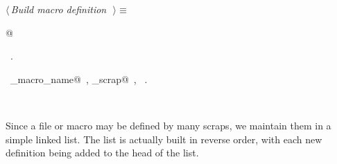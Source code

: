 \documentclass{report}
\begin{document}
\begin{flushleft} \small
\begin{minipage}{\linewidth} \label{scrap39}
$\langle\,${\it Build macro definition}\nobreak\ {\footnotesize {}}$\,\rangle\equiv$
\vspace{-1ex}
\begin{list}{}{} \item
\mbox{}@{\NWsep}
\end{list}
\vspace{-1ex}
\footnotesize\addtolength{\baselineskip}{-1ex}
\begin{list}{}{\setlength{\itemsep}{-\parsep}\setlength{\itemindent}{-\leftmargin}}
\item \NWtxtMacroRefIn\ .
\end{list}
\vspace{-2ex}
\footnotesize\addtolength{\baselineskip}{-1ex}
\begin{list}{}{\setlength{\itemsep}{-\parsep}\setlength{\itemindent}{-\leftmargin}}
\item \NWtxtIdentsUsed\nobreak\  \verb@collect_macro_name@\nobreak\ , \verb@collect_scrap@\nobreak\ , \verb@Name@\nobreak\ .\end{list}
\end{minipage}\\[4ex]
\end{flushleft}
Since a file or macro may be defined by many scraps, we maintain them
in a simple linked list. The list is actually built in reverse order,
with each new definition being added to the head of the list.
\end{document}
